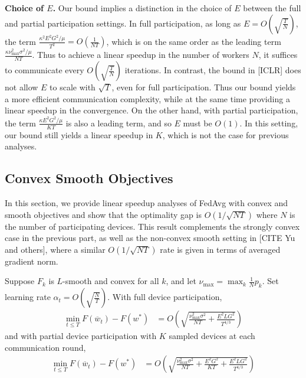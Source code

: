 %
\begin{remark}
	\textbf{Choice of $E$.} Our bound implies a distinction in the choice
	of $E$ between the full and partial participation settings. In full
	participation, as long as $E=O(\sqrt{\frac{T}{N}})$, the term $\frac{\kappa^{2}E^{2}G^{2}/\mu}{T^{2}}=O(\frac{1}{NT})$,
	which is on the same order as the leading term $\frac{\kappa\nu_{\max}^{2}\sigma^{2}/\mu}{NT}$.
	Thus to achieve a linear speedup in the number of workers $N$, it
	suffices to communicate every $O(\sqrt{\frac{T}{N}})$ iterations.
	In contrast, the bound in {[}ICLR{]} does not allow $E$ to scale
	with $\sqrt{T}$, even for full participation. Thus our bound yields
	a more efficient communication complexity, while at the same time
	providing a linear speedup in the convergence. On the other hand,
	with partial participation, the term $\frac{\kappa E^{2}G^{2}/\mu}{KT}$
	is also a leading term, and so $E$ must be $O(1)$. In this setting,
	our bound still yields a linear speedup in $K$, which is not the
	case for previous analyses. 
\end{remark}

\subsection{Convex Smooth Objectives}

In this section, we provide linear speedup analyses of FedAvg with
convex and smooth objectives and show that the optimality gap is $O(1/\sqrt{NT})$
where $N$ is the number of participating devices. This result complements
the strongly convex case in the previous part, as well as the non-convex
smooth setting in {[}CITE Yu and others{]}, where a similar $O(1/\sqrt{NT})$
rate is given in terms of averaged gradient norm. 
\begin{theorem}
	Suppose $F_{k}$ is $L$-smooth and convex for all $k$, and let $\nu_{\max}=\max_{k}\frac{1}{N}p_{k}$.
	Set learning rate $\alpha_{t}=O(\sqrt{\frac{N}{T}})$. With full device participation, 
	\begin{align*}
	\min_{t\leq T}F(\overline{w}_{t})-F(w^{\ast}) & =O(\sqrt{\frac{\nu_{\max}^{2}\sigma^{2}}{NT}+\frac{E^{2}LG^{2}}{T^{4/3}}})
	\end{align*}
	and with partial device participation with $K$ sampled devices at
	each communication round, 
	\begin{align*}
	\min_{t\leq T}F(\overline{w}_{t})-F(w^{\ast}) & =O(\sqrt{\frac{\nu_{\max}^{2}\sigma^{2}}{NT}+\frac{E^{2}G^{2}}{KT}+\frac{E^{2}LG^{2}}{T^{4/3}}})
	\end{align*}
\end{theorem}

